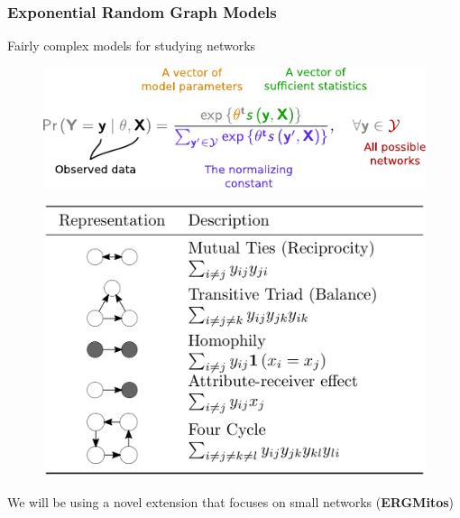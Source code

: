 \documentclass[aspectratio=169, 9pt]{beamer}\usepackage[]{graphicx}\usepackage[]{color}
\begin{document}
\begin{frame}
\frametitle{Exponential Random Graph Models}

Fairly complex models for studying networks \vspace{1cm}

\begin{minipage}[c]{.55\linewidth}
\begin{figure}
\centering
\includegraphics[width=.99\linewidth]{parts-of-ergm.pdf}
\end{figure}
\end{minipage}
\hfill
\begin{minipage}[c]{.40\linewidth}
\begin{figure}
\includegraphics[width=.99\linewidth]{ergm-terms-paper.png}
\end{figure}
\end{minipage}

\vspace{1cm} \pause{} We will be using a novel extension that focuses on small networks (\textbf{ERGMitos})

\end{frame}
\end{document}
